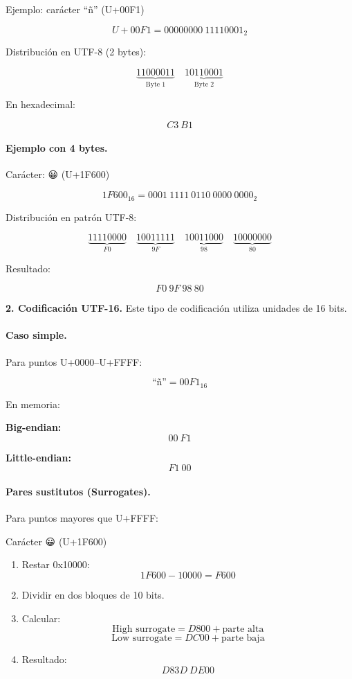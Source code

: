 \documentclass[12pt,twoside]{book}
\begin{document}
				Ejemplo: carácter ``ñ'' (U+00F1)
				
				\[
				U+00F1 = 00000000\ 11110001_2
				\]
				
				\noindent
				Distribución en UTF-8 (2 bytes):
				
				\[
				\underbrace{11000011}_{\text{Byte 1}}
				\quad
				\underbrace{10110001}_{\text{Byte 2}}
				\]
				
				\noindent
				En hexadecimal:
				
				\[
				C3\ B1
				\]
				
				\paragraph{Ejemplo con 4 bytes.} Carácter: \emojiFont 😀 (U+1F600)
				
				\[
				1F600_{16} = 0001\ 1111\ 0110\ 0000\ 0000_2
				\]
				
				\noindent
				Distribución en patrón UTF-8:
				
				\[
				\underbrace{11110000}_{F0}
				\quad
				\underbrace{10011111}_{9F}
				\quad
				\underbrace{10011000}_{98}
				\quad
				\underbrace{10000000}_{80}
				\]
				
				\noindent
				Resultado:
				
				\[
				F0\ 9F\ 98\ 80
				\]
				
				\noindent
				\textbf{2. Codificación UTF-16.} Este tipo de codificación utiliza unidades de 16 bits.
				
				\paragraph{Caso simple. } Para puntos U+0000--U+FFFF:
				
				\[
				\text{``ñ''} = 00F1_{16}
				\]
				
				\noindent
				En memoria:
				
				\textbf{Big-endian:}
				\[
				00\ F1
				\]
				
				\textbf{Little-endian:}
				\[
				F1\ 00
				\]
				
				\paragraph{Pares sustitutos (Surrogates).}
				
				Para puntos mayores que U+FFFF:
				
				Carácter 😀 (U+1F600)
				
				\begin{enumerate}
					\item Restar 0x10000:
					\[
					1F600 - 10000 = F600
					\]
					\item Dividir en dos bloques de 10 bits.
					\item Calcular:
					\[
					\text{High surrogate} = D800 + \text{parte alta}
					\]
					\[
					\text{Low surrogate} = DC00 + \text{parte baja}
					\]
					\item Resultado:
					\[
					D83D\ DE00
					\]
				\end{enumerate}
				
\end{document}
